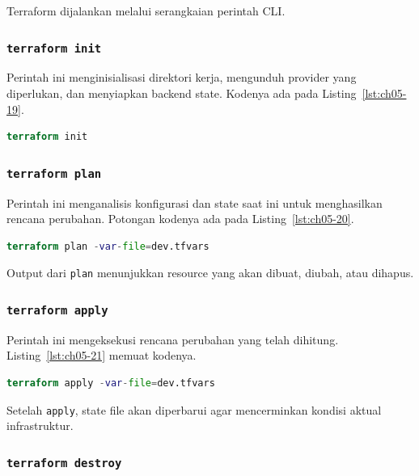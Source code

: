 Terraform dijalankan melalui serangkaian perintah CLI.

\subsubsection*{\texttt{terraform init}}

Perintah ini menginisialisasi direktori kerja, mengunduh provider yang diperlukan, dan menyiapkan backend state. Kodenya ada pada Listing~\ref{lst:ch05-19}.

\begin{lstlisting}[language=terraform, caption={Potongan kode Terraform pada terraform init}, label={lst:ch05-19}]
terraform init
\end{lstlisting}

\subsubsection*{\texttt{terraform plan}}

Perintah ini menganalisis konfigurasi dan state saat ini untuk menghasilkan rencana perubahan. Potongan kodenya ada pada Listing~\ref{lst:ch05-20}.

\begin{lstlisting}[language=terraform, caption={Potongan kode Terraform pada terraform plan}, label={lst:ch05-20}]
terraform plan -var-file=dev.tfvars
\end{lstlisting}

Output dari \texttt{plan} menunjukkan resource yang akan dibuat, diubah, atau dihapus.

\subsubsection*{\texttt{terraform apply}}

Perintah ini mengeksekusi rencana perubahan yang telah dihitung. Listing~\ref{lst:ch05-21} memuat kodenya.

\begin{lstlisting}[language=terraform, caption={Potongan kode Terraform pada terraform apply}, label={lst:ch05-21}]
terraform apply -var-file=dev.tfvars
\end{lstlisting}

Setelah \texttt{apply}, state file akan diperbarui agar mencerminkan kondisi aktual infrastruktur.

\subsubsection*{\texttt{terraform destroy}}

